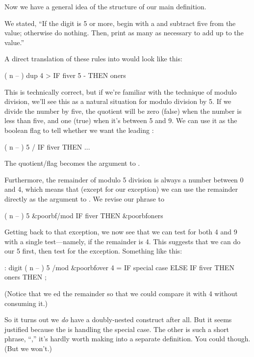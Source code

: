 Now we have a general idea of the structure of our main definition.

We stated, ``If the digit is 5 or more, begin with a  and
subtract five from the value; otherwise do nothing. Then, print as many
 as necessary to add up to the value.''

A direct translation of these rules into \Forth{} would look like this:

\begin{Code}
( n -- )  dup  4 > IF  fiver 5 -  THEN  oners
\end{Code}
This is technically correct, but if we're familiar with the technique of
modulo division, we'll see this as a natural situation for modulo division
by 5. If we divide the number by five, the quotient will be zero (false)
when the number is less than five, and one (true) when it's between 5 and
9. We can use it as the boolean flag to tell whether we want the leading
:

\begin{Code}
( n -- )  5 / IF  fiver  THEN ...
\end{Code}
The quotient/flag becomes the argument to .

Furthermore, the remainder of modulo 5 division is always a number between
0 and 4, which means that (except for our exception) we can use the
remainder directly as the argument to . We revise our phrase
to

\begin{Code}[commandchars=\&\{\}]
( n -- )  5 &poorbf{/mod} IF  fiver  THEN  &poorbf{oners}
\end{Code}
Getting back to that exception, we now see that we can test for both 4 and
9 with a single test---namely, if the remainder is 4. This suggests that
we can do our 5  first, then test for the exception.
Something like this:

\begin{Code}[commandchars=\&\{\}]
: digit  ( n -- )
     5 /mod  &poorbf{over 4 =  IF  special case  ELSE}
     IF  fiver  THEN  oners  THEN ;
\end{Code}
(Notice that we ed the remainder so that we could compare it with
4 without consuming it.)

So it turns out we \emph{do} have a doubly-nested 
construct after all. But it seems justified because the 
is handling the special case. The other is such a short phrase,
``,'' it's hardly worth making into a separate
definition. You could though. (But we won't.)

